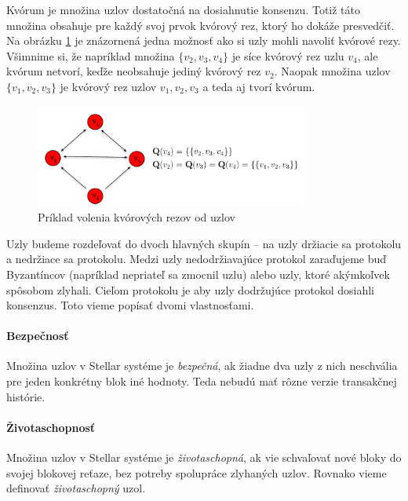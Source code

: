 \begin{flushleft}
Kvórum je množina uzlov dostatočná na dosiahnutie konsenzu. Totiž táto množina obsahuje
pre každý svoj prvok kvórový rez, ktorý ho dokáže presvedčiť.
Na obrázku \ref{obr:kvorum} je znázornená jedna možnosť ako si uzly mohli navoliť
kvórové rezy.
Všimnime si, že napríklad množina $\{v_2, v_3, v_4\}$ je síce kvórový rez uzlu
$v_4$, ale kvórum netvorí, keďže neobsahuje jediný kvórový rez $v_2$.
Naopak množina uzlov $\{v_1, v_2, v_3\}$ je kvórový rez uzlov $v_1, v_2, v_3$ a
teda aj tvorí kvórum.

\begin{figure}
\centerline{\includegraphics[width=0.8\textwidth]{images/kvorum.pdf}}
\caption[Príklad siete]{Príklad volenia kvórových rezov od uzlov} \label{obr:kvorum}
\end{figure}

\end{flushleft}

Uzly budeme rozdeľovať do dvoch hlavných skupín -- na uzly držiacie sa protokolu a
nedržiace sa protokolu. Medzi uzly nedodržiavajúce protokol zaraďujeme buď
Byzantíncov (napríklad nepriateľ sa zmocnil uzlu) alebo uzly, ktoré akýmkoľvek
spôsobom zlyhali.
Cieľom protokolu je aby uzly dodržujúce protokol dosiahli konsenzus. Toto vieme
popísať dvomi vlastnosťami.

\paragraph {Bezpečnosť} Množina uzlov v Stellar systéme je \textit{bezpečná}, ak žiadne
dva uzly z nich neschvália pre jeden konkrétny blok iné hodnoty. Teda nebudú mať
rôzne verzie transakčnej histórie.

\paragraph {Životaschopnosť} Množina uzlov v Stellar systéme je \textit{životaschopná},
ak vie schvaľovať nové bloky do svojej blokovej reťaze, bez potreby spolupráce
zlyhaných uzlov. Rovnako vieme definovať \textit{životaschopný} uzol.

